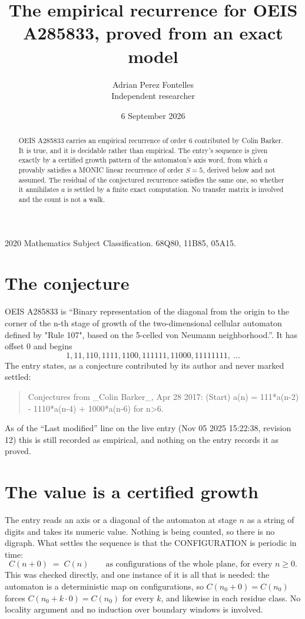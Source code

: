 \documentclass[11pt,a4paper]{article}
\title{The empirical recurrence for OEIS A285833, proved from an exact model}
\author{Adrian Perez Fontelles\\ \small Independent researcher}
\date{6 September 2026}
\theoremstyle{plain}
\theoremstyle{definition}
\begin{document}
\maketitle

\begin{abstract}
OEIS A285833 carries an empirical recurrence of order $6$ contributed by Colin Barker. It is true, and it is
decidable rather than empirical. The entry's sequence is given exactly by a certified growth pattern of the automaton's axis word, from
which $a$ provably satisfies a MONIC linear recurrence of order $S=5$, derived below and not
assumed. The residual of the conjectured recurrence satisfies the same one, so whether it
annihilates $a$ is settled by a finite exact computation. No transfer matrix is involved and
the count is not a walk.
\end{abstract}

\noindent\small 2020 Mathematics Subject Classification. 68Q80, 11B85, 05A15.\normalsize

\section{The conjecture}

OEIS A285833 is ``Binary representation of the diagonal from the origin to the corner of the n-th stage of growth of the two-dimensional cellular automaton defined by "Rule 107", based on the 5-celled von Neumann neighborhood.''. It has offset $0$ and begins
\[
1, 11, 110, 1111, 1100, 111111, 11000, 11111111,\ \dots
\]
The entry states, as a conjecture contributed by its author and never marked settled:
\begin{quote}
Conjectures from \_Colin Barker\_, Apr 28 2017: (Start) a(n) = 111*a(n-2) - 1110*a(n-4) + 1000*a(n-6) for n>6.
\end{quote}
As of the ``Last modified'' line on the live entry (Nov 05 2025 15:22:38, revision 12)
this is still recorded as empirical, and nothing on the entry records it as proved.

\section{The value is a certified growth}

The entry reads an axis or a diagonal of the automaton at stage $n$ as a string of digits and
takes its numeric value. Nothing is being counted, so there is no digraph. What settles the
sequence is that the CONFIGURATION is periodic in time:
\[
C(n+0)\;=\;C(n)\qquad\text{as configurations of the whole plane, for every } n\ge 0.
\]
This was checked directly, and one instance of it is all that is needed: the automaton is a
deterministic map on configurations, so $C(n_0+0)=C(n_0)$ forces $C(n_0+k\cdot0)=C(n_0)$ for
every $k$, and likewise in each residue class. No locality argument and no induction over
boundary windows is involved.
\end{document}
